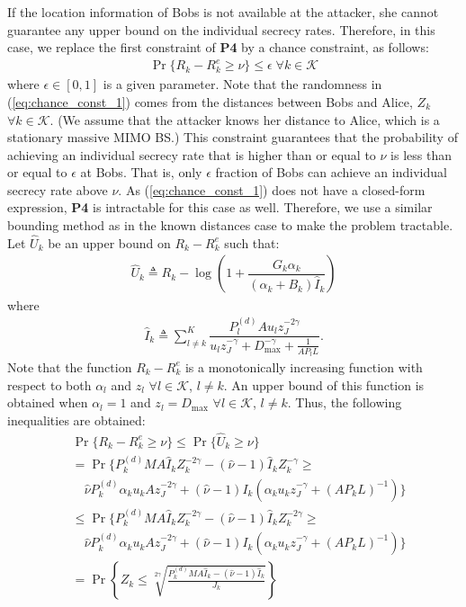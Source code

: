 \documentclass[draftclsnofoot, 12pt, onecolumn, journal]{IEEEtran}
\begin{document}
If the location information of Bobs is not available at the attacker, she cannot guarantee any upper bound on the individual secrecy rates.
Therefore, in this case, we replace the first constraint of \textbf{P4} by a chance constraint, as follows:
%
\begin{align}
\Pr \{ R_k - R_k^e \geq \nu \} \leq \epsilon \; \forall k \in \mathcal{K}
\label{eq:chance_const_1}
\end{align}  
%
where $\epsilon \in [0,1]$ is a given parameter.
Note that the randomness in (\ref{eq:chance_const_1}) comes from the distances between Bobs and Alice, $Z_k$ $\forall k \in \mathcal{K}$.
(We assume that the attacker knows her distance to Alice, which is a stationary massive MIMO BS.)  
This constraint guarantees that the probability of achieving an individual secrecy rate that is higher than or equal to $\nu$ is less than or equal to $\epsilon$ at Bobs.
That is, only $\epsilon$ fraction of Bobs can achieve an individual secrecy rate above $\nu$.
As (\ref{eq:chance_const_1}) does not have a closed-form expression, \textbf{P4} is intractable for this case as well.
Therefore, we use a similar bounding method as in the known distances case to make the problem tractable.
Let $\hat{U}_k$ be an upper bound on $R_k - R_k^e$ such that:
%
\begin{align}
\hat{U}_k \triangleq R_k - \log \left( 1 +  \dfrac{G_k \alpha_k}{ (\alpha_k + B_k) \hat{I}_k } \right)
\end{align}
%
where
%
\begin{align}
\hat{I}_k \triangleq \sum_{l \neq k}^K \dfrac{ P_l^{(d)} A u_l z_J^{-2 \gamma} }{ u_l z_J^{-\gamma} + D_{\mathrm{max}}^{- \gamma} + \frac{1}{A P_l L}}.
\end{align}
%
Note that the function $ R_k - R_k^e$ is a monotonically increasing function with respect to both $\alpha_l$ and $z_l$ $\forall l \in \mathcal{K}$, $l \neq k$.
An upper bound of this function is obtained when $\alpha_l = 1$ and $z_l = D_{ \mathrm{max} }$ $\forall l \in \mathcal{K}$, $l \neq k$.
Thus, the following inequalities are obtained:
%
\begin{align}
& \Pr \{ R_k - R_k^e \geq \nu \} \leq \Pr \{ \hat{U}_k \geq \nu \}  \\
& = \Pr \{ P_k^{(d)} M A \hat{I}_k Z_k^{-2 \gamma} - (\hat{\nu} - 1) \hat{I}_k Z_k^{-\gamma} \geq  \nonumber \\ 
& \quad \hat{\nu} P_k^{(d)} \alpha_k u_k A z_J^{-2 \gamma} + ( \hat{\nu} - 1 ) I_k (\alpha_k u_k z_J^{ -\gamma } + (A P_k L)^{-1} ) \} \\
& \leq \Pr \{  P_k^{(d)} M A \hat{I}_k Z_k^{-2 \gamma} - (\hat{\nu} - 1) \hat{I}_k Z_k^{-2 \gamma} \geq \nonumber \\ 
& \quad  \hat{\nu} P_k^{(d)} \alpha_k u_k A z_J^{-2 \gamma} + ( \hat{\nu} - 1 ) I_k (\alpha_k u_k z_J^{ -\gamma } + (A P_k L)^{-1} ) \} \\
& = \Pr \left\lbrace Z_k \leq \sqrt[2 \gamma]{ \frac{P_k^{(d)} M A \hat{I}_k - (\hat{\nu} - 1) \hat{I}_k}{ J_k } }  \right\rbrace
\label{eq:prob_upper_bond}
\end{align}
\end{document}
